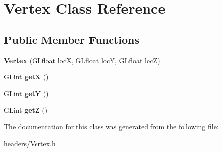 \hypertarget{class_vertex}{\section{Vertex Class Reference}
\label{class_vertex}
}
\subsection*{Public Member Functions}
\begin{DoxyCompactItemize}
\item 
\hypertarget{class_vertex_aae34eee8edc5e3e83b85d1cfffc99e15}{{\bfseries Vertex} (G\+Lfloat loc\+X, G\+Lfloat loc\+Y, G\+Lfloat loc\+Z)}\label{class_vertex_aae34eee8edc5e3e83b85d1cfffc99e15}

\item 
\hypertarget{class_vertex_a8afd74eceab3e58b9d49186f27a141c8}{G\+Lint {\bfseries get\+X} ()}\label{class_vertex_a8afd74eceab3e58b9d49186f27a141c8}

\item 
\hypertarget{class_vertex_ad25aa082ad632ff2d0034098cacf6875}{G\+Lint {\bfseries get\+Y} ()}\label{class_vertex_ad25aa082ad632ff2d0034098cacf6875}

\item 
\hypertarget{class_vertex_af664ac862ef7ee8a83bce05734ea33ae}{G\+Lint {\bfseries get\+Z} ()}\label{class_vertex_af664ac862ef7ee8a83bce05734ea33ae}

\end{DoxyCompactItemize}


The documentation for this class was generated from the following file\+:\begin{DoxyCompactItemize}
\item 
headers/Vertex.\+h\end{DoxyCompactItemize}
